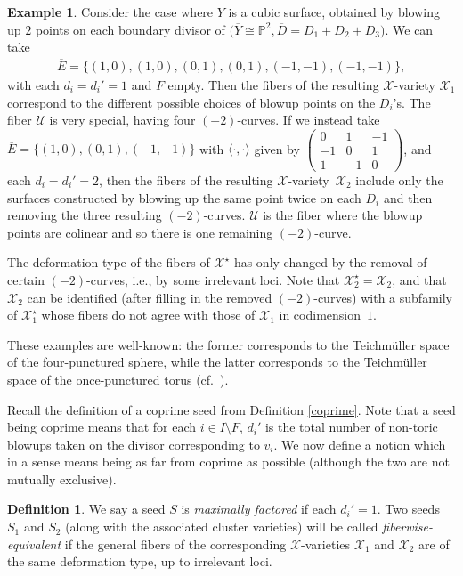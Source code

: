 \documentclass[10pt,a4paper]{amsart}
\numberwithin{equation}{section}
\numberwithin{figure}{section}
\numberwithin{table}{section}
\let\?=\overline
\let\bb=\mathbb
\let\s=\mathcal
\theoremstyle{definition}
\newtheorem{dfn}[thm]{Definition}
\newtheorem{eg}[thm]{Example}
\begin{document}
\begin{eg}\label{cubic cluster}
Consider the case where $Y$ is a cubic surface, obtained by blowing up $2$ points on each boundary divisor of $\big(\?{Y}\cong \bb{P}^2,\?{D}=D_1+D_2+D_3\big)$. We can take
\begin{gather*}
	\?{E}=\{(1,0),(1,0),(0,1),(0,1),(-1,-1),(-1,-1)\},
\end{gather*}
with each $d_i=d_i'=1$ and $F$ empty. Then the fibers of the resulting $\s{X}$-variety $\s{X}_1$ correspond to the different possible choices of blowup points on the $D_i$'s. The fiber $\s{U}$ is very special, having four $(-2)$-curves. If we instead take $\?{E}=\{(1,0),(0,1),(-1,-1)\}$ with $\langle \cdot,\cdot\rangle$ given by
	$\left(\begin{smallmatrix}
		0 &1 &-1 \\
	 -1 &0 &1 \\
	 1 &-1 &0
		\end{smallmatrix}\right)$,
		and each $d_i=d_i'=2$, then the fibers of the resulting $\s{X}$-variety~$\s{X}_2$ include only the surfaces constructed by blowing up the same point twice on each $D_i$ and then removing the three resulting $(-2)$-curves. $\s{U}$ is the fiber where the blowup points are colinear and so there is one remaining $(-2)$-curve.
		
The deformation type of the fibers of $\s{X}^{\star}$ has only changed by the removal of certain $(-2)$-curves, i.e., by some irrelevant loci. Note that $\s{X}^{\star}_2=\s{X}_2$, and that $\s{X}_2$ can be identified (after filling in the removed $(-2)$-curves) with a subfamily of $\s{X}^{\star}_1$ whose fibers do not agree with those of $\s{X}_1$ in codimension~$1$.

These examples are well-known: the former corresponds to the Teichm\"{u}ller space of the four-punctured sphere, while the latter corresponds to the Teichm\"{u}ller space of the once-punctured torus (cf.\ \cite[Section~2.7]{FG1}).
\end{eg}

Recall the definition of a coprime seed from Definition \ref{coprime}. Note that a seed being coprime means that for each $i\in I\setminus F$, $d_i'$ is the total number of non-toric blowups taken on the divisor corresponding to $v_i$. We now define a notion which in a sense means being as far from coprime as possible (although the two are not mutually exclusive).

\begin{dfn}\label{EquivalentClusters} We say a seed $S$ is {\it maximally factored} if each $d_i'=1$. Two seeds $S_1$ and $S_2$ (along with the associated cluster varieties) will be called {\it fiberwise-equivalent} if the general fibers of the corresponding $\s{X}$-varieties $\s{X}_1$ and $\s{X}_2$ are of the same deformation type, up to irrelevant loci.
\end{dfn}
\end{document}
